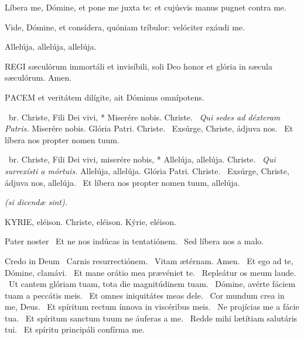 Líbera me, Dómine, et pone me juxta te: et cujúsvis manus pugnet contra me.


 Vide, Dómine, et consídera, quóniam tríbulor: velóciter exáudi me.


 Allelúja, allelúja, allelúja.



\lettrine[lines=2]{R}{EGI} sæculórum immortáli et invisíbili, soli Deo honor et glória in sæcula sæculórum. Amen.



\lettrine[lines=2]{P}{ACEM} et veritátem dilígite, ait Dóminus omnípotens.

\R\ br. Christe, Fili Dei vivi, * Miserére nobis. Christe. \V\ \textit{Qui sedes ad déxteram Patris.} Miserére nobis. Glória Patri. Christe. \V\ Exsúrge, Christe, ádjuva nos. \R\ Et líbera nos propter nomen tuum.



\R\ br. Christe, Fili Dei vivi, miserére nobis, * Allelúja, allelúja. Christe. \V\ \textit{Qui surrexísti a mórtuis.} Allelúja, allelúja. Glória Patri. Christe. \V\ Exsúrge, Christe, ádjuva nos, allelúja. \R\ Et líbera nos propter nomen tuum, allelúja.

\sectionornament


\textit{(si dicendæ sint).}

KYRIE, eléison. Christe, eléison. Kýrie, eléison.

Pater noster  \V\ Et ne nos indúcas in tentatiónem. \R\ Sed líbera nos a malo.

Credo in Deum  \V\ Carnis resurrectiónem. \R\ Vitam ætérnam. Amen. \V\ Et ego ad te, Dómine, clamávi. \R\ Et mane orátio mea prævéniet te. \V\ Repleátur os meum laude. \R\ Ut cantem glóriam tuam, tota die magnitúdinem tuam. \V\ Dómine, avérte fáciem tuam a peccátis meis. \R\ Et omnes iniquitátes meas dele. \V\ Cor mundum crea in me, Deus. \R\ Et spíritum rectum ínnova in viscéribus meis. \V\ Ne projícias me a fácie tua. \R\ Et spíritum sanctum tuum ne áuferas a me. \V\ Redde mihi lætítiam salutáris tui. \R\ Et spíritu principáli confírma me.

